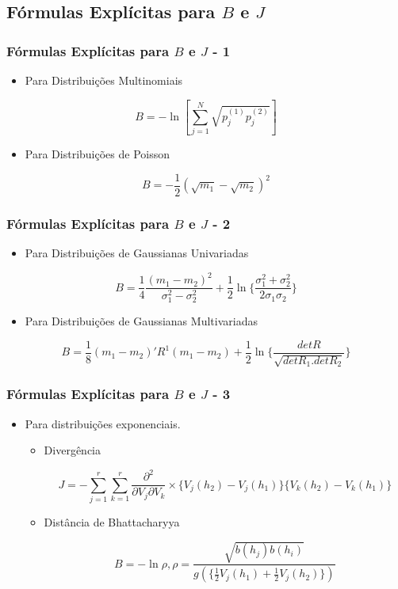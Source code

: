 \documentclass{beamer}
\begin{document}
\subsection{Fórmulas Explícitas para $B$ e $J$}


\begin{frame}
    \frametitle{Fórmulas Explícitas para $B$ e $J$ - 1}

	\begin{itemize}
		\item Para Distribuições Multinomiais
	\end{itemize}    
	$$B = -\ln [\sum_{j=1}^{N} \sqrt{p_j^{(1)}p_j^{(2)}}] $$    
	
	\begin{itemize}
		\item Para Distribuições de Poisson
	\end{itemize}    
	$$B = - \frac{1}{2} (\sqrt{m_1}-\sqrt{m_2})^2 $$    
	
    
\end{frame}

\begin{frame}
    \frametitle{Fórmulas Explícitas para $B$ e $J$ - 2}

	\begin{itemize}
		\item Para Distribuições de Gaussianas Univariadas
	\end{itemize}    
	$$B = \frac{1}{4} \frac{(m_1-m_2)^2}{\sigma_1^2-\sigma_2^2} + \frac{1}{2} \ln \{\frac{\sigma_1^2+\sigma_2^2}{2\sigma_1\sigma_2}\}$$
	\begin{itemize}
		\item Para Distribuições de Gaussianas Multivariadas
	\end{itemize}    
	$$ B = \frac{1}{8} (m_1-m_2)'R^{1}(m_1-m_2) + \frac{1}{2} \ln \{\frac{det R}{\sqrt{det R_1. det R_2}}\}$$
	
    
\end{frame}
    
    
\begin{frame}
    \frametitle{Fórmulas Explícitas para $B$ e $J$ - 3}
    
    
    \begin{itemize}
    	\item Para distribuições exponenciais.
    	\begin{itemize}
    		\item Divergência	
    		
    		$$ J = - \sum_{j = 1}^{r} \sum_{k = 1}^{r} \frac{\partial^2}{\partial V_j \partial V_k} \times \{ V_j(h_2) - V_j(h_1)\}\{ V_k(h_2) - V_k(h_1)\} $$    
	
			\item Distância de Bhattacharyya
	
			$$ B = - \ln \rho, \rho = \frac{\sqrt{b(h_j)b(h_i)}}{g (\{\frac{1}{2}V_j(h_1) +\frac{1}{2}V_j(h_2) \})} $$
		\end{itemize}
	\end{itemize}
\end{frame}
\end{document}

